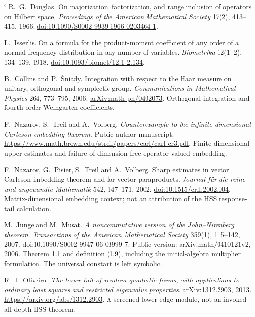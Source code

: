 \documentclass[11pt,oneside,openany,a4paper]{book}
\makeatletter
\numberwithin{equation}{chapter}
\theoremstyle{definition}
\theoremstyle{remark}
\renewenvironment{thebibliography}[1]
 {\list{\@biblabel{\@arabic\c@enumiv}}%
 {\settowidth\labelwidth{\@biblabel{#1}}\leftmargin\labelwidth
 \advance\leftmargin\labelsep\@openbib@code\usecounter{enumiv}
 \let\p@enumiv\@empty\renewcommand\theenumiv{\@arabic\c@enumiv}}%
 \sloppy\clubpenalty4000\widowpenalty4000\sfcode`\.\@m}
 {\def\@noitemerr{\@latex@warning{Empty bibliography}}\endlist}
\makeatother
\begin{document}
\begin{thebibliography}{99}
R.~G.~Douglas.
On majorization, factorization, and range inclusion of operators on Hilbert
space.
\emph{Proceedings of the American Mathematical Society} 17(2), 413--415,
1966.
\href{https://doi.org/10.1090/S0002-9939-1966-0203464-1}
{doi:10.1090/S0002-9939-1966-0203464-1}.

L.~Isserlis. On a formula for the product-moment coefficient of any order of a normal frequency distribution in any number of variables. \emph{Biometrika} 12(1--2), 134--139, 1918. \href{https://doi.org/10.1093/biomet/12.1-2.134}{doi:10.1093/biomet/12.1-2.134}.

B.~Collins and P.~\'Sniady. Integration with respect to the Haar measure on unitary, orthogonal and symplectic group. \emph{Communications in Mathematical Physics} 264, 773--795, 2006. \href{https://arxiv.org/abs/math-ph/0402073}{arXiv:math-ph/0402073}. Orthogonal integration and fourth-order Weingarten coefficients.

F.~Nazarov, S.~Treil and A.~Volberg. \emph{Counterexample to the infinite dimensional Carleson embedding theorem}. Public author manuscript. \url{https://www.math.brown.edu/streil/papers/carl/carl-cr3.pdf}. Finite-dimensional upper estimates and failure of dimension-free operator-valued embedding.

F.~Nazarov, G.~Pisier, S.~Treil and A.~Volberg. Sharp estimates in vector Carleson imbedding theorem and for vector paraproducts. \emph{Journal f\"ur die reine und angewandte Mathematik} 542, 147--171, 2002. \href{https://doi.org/10.1515/crll.2002.004}{doi:10.1515/crll.2002.004}. Matrix-dimensional embedding context; not an attribution of the HSS response-tail calculation.

M.~Junge and M.~Musat. \emph{A noncommutative version of the John--Nirenberg theorem}. \emph{Transactions of the American Mathematical Society} 359(1), 115--142, 2007. \href{https://doi.org/10.1090/S0002-9947-06-03999-7}{doi:10.1090/S0002-9947-06-03999-7}. Public version: \href{https://arxiv.org/abs/math/0410121}{arXiv:math/0410121v2}, 2006. Theorem 1.1 and definition (1.9), including the initial-algebra multiplier formulation. The universal constant is left symbolic.

R.~I.~Oliveira. \emph{The lower tail of random quadratic forms, with applications to ordinary least squares and restricted eigenvalue properties}. arXiv:1312.2903, 2013. \url{https://arxiv.org/abs/1312.2903}. A screened lower-edge module, not an invoked all-depth HSS theorem.

\end{thebibliography}
\endgroup
\end{document}
